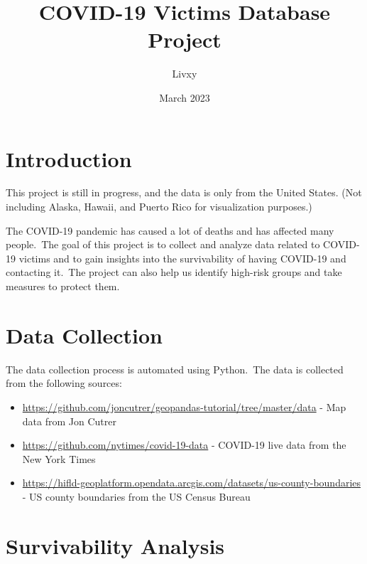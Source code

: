 \documentclass{article}
\begin{document}
\title{COVID-19 Victims Database Project}
\author{Livxy}
\date{March 2023}

\maketitle
\thispagestyle{empty}
\vspace{50cm}
\setlength{\columnsep}{14pt}


\section{Introduction}
\begin{boxH}
    This project is still in progress, and the data is only from the United States. (Not including Alaska, Hawaii, and Puerto Rico for visualization purposes.)
\end{boxH}

\indent

The COVID-19 pandemic has caused a lot of deaths and has affected many people.\
The goal of this project is to collect and analyze data related to COVID-19 victims and to gain insights into the survivability of having COVID-19 and contacting it.\
The project can also help us identify high-risk groups and take measures to protect them.


\section{Data Collection}
\indent

The data collection process is automated using Python.\
The data is collected from the following sources: \
\begin{itemize}
    \item \cite{cutrer} \url{https://github.com/joncutrer/geopandas-tutorial/tree/master/data} - Map data from Jon Cutrer
    \item \cite{nytimes} \url{https://github.com/nytimes/covid-19-data} - COVID-19 live data from the New York Times
    \item \cite{census} \url{https://hifld-geoplatform.opendata.arcgis.com/datasets/us-county-boundaries} - US county boundaries from the US Census Bureau
\end{itemize}



\section{Survivability Analysis}
\end{document}
